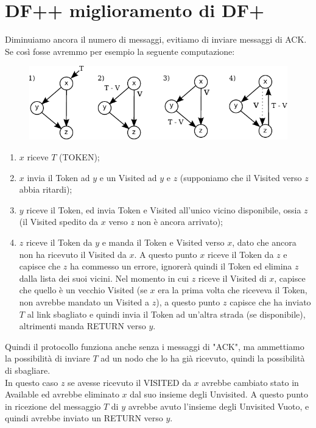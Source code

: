 \section{DF++ miglioramento di DF+}

Diminuiamo ancora il numero di messaggi, evitiamo di inviare messaggi di ACK. Se
così fosse avremmo per esempio la seguente computazione:

\begin{figure}[H]
    \centering
    \includegraphics[width=13cm, keepaspectratio]{capitoli/attraversamento/imgs/n_17}
\end{figure}

\begin{enumerate}
    \item $x$ riceve $T$ (TOKEN);
    \item $x$ invia il Token ad $y$ e un Visited ad $y$ e $z$ (supponiamo che il
          Visited verso $z$ abbia ritardi);
    \item $y$ riceve il Token, ed invia Token e Visited all'unico vicino
          disponibile, ossia $z$ (il Visited spedito da $x$ verso $z$ non è ancora
          arrivato);
    \item $z$ riceve il Token da $y$ e manda il Token e Visited verso $x$, dato
          che ancora non ha ricevuto il Visited da $x$. A questo punto $x$
          riceve il Token da $z$ e capisce che $z$ ha commesso un errore,
          ignorerà quindi il Token ed elimina $z$ dalla lista dei suoi vicini.
          Nel momento in cui $z$ riceve il Visited di $x$, capisce che quello è
          un vecchio Visited (se $x$ era la prima volta che riceveva il Token,
          non avrebbe mandato un Visited a $z$), a questo punto $z$ capisce che
          ha inviato $T$ al link sbagliato e quindi invia il Token ad un'altra
          strada (se disponibile), altrimenti manda RETURN verso $y$.
\end{enumerate}

Quindi il protocollo funziona anche senza i messaggi di "ACK", ma ammettiamo la
possibilità di inviare $T$ ad un nodo che lo ha già ricevuto, quindi la
possibilità di sbagliare.\\
In questo caso $z$ se avesse ricevuto il VISITED da $x$ avrebbe cambiato stato
in Available ed avrebbe eliminato $x$ dal suo insieme degli Unvisited. A questo
punto in ricezione del messaggio $T$ di $y$ avrebbe avuto l'insieme degli
Unvisited Vuoto, e quindi avrebbe inviato un RETURN verso $y$.


